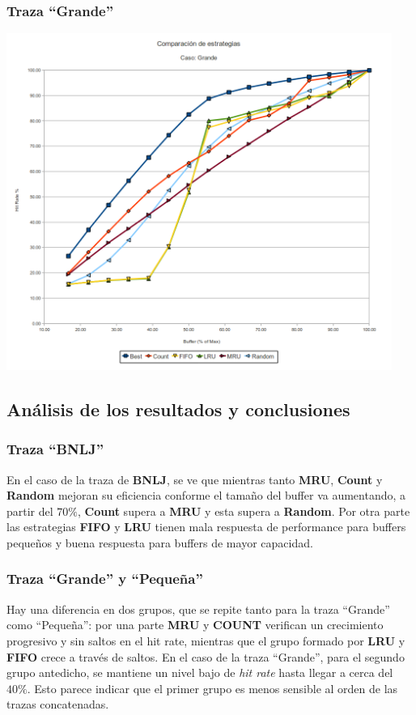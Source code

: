 \subsubsection*{Traza ``Grande''} 
\begin{center}
  \includegraphics[height=11cm]{big.png}
\end{center}  


\subsection{An\'alisis de los resultados y conclusiones}

\subsubsection*{Traza ``BNLJ''}
En el caso de la traza de \textbf{BNLJ}, se ve que mientras tanto \textbf{MRU}, \textbf{Count} y \textbf{Random} mejoran su eficiencia conforme el tama\~no del buffer
va aumentando, a partir del $70\%$, \textbf{Count} supera a \textbf{MRU} y esta supera a \textbf{Random}. Por otra parte las estrategias \textbf{FIFO} y \textbf{LRU} tienen
mala respuesta de performance para buffers peque\~nos y buena respuesta para buffers de mayor capacidad. 

\subsubsection*{Traza ``Grande'' y ``Peque\~na''}

Hay una diferencia en dos grupos, que se repite tanto para la traza ``Grande'' como ``Peque\~na'': por una parte \textbf{MRU} y \textbf{COUNT} verifican un crecimiento progresivo y sin saltos en el hit rate, mientras que el grupo formado por \textbf{LRU} y \textbf{FIFO} crece a trav\'es de saltos. En el caso de la traza ``Grande'', para el segundo grupo antedicho, se mantiene un nivel bajo de \textit{hit rate} hasta llegar a cerca del $40\%$.  Esto parece indicar que el primer grupo es menos sensible al orden de las trazas concatenadas.

